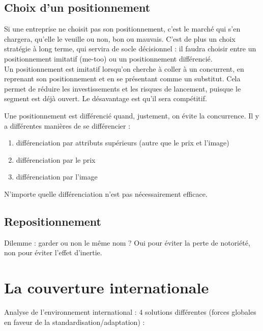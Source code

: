		
		\subsection{Choix d'un positionnement}
		
		Si une entreprise ne choisit pas son positionnement, c'est le marché qui s'en chargera, qu'elle le veuille ou non, bon ou mauvais. C'est de plus un choix stratégie à long terme, qui servira de socle décisionnel : il faudra choisir entre un positionnement imitatif (me-too) ou un positionnement différencié. \\
		
		Un positionnement est imitatif lorsqu'on cherche à coller à un concurrent, en reprenant son positionnement et en se présentant comme un substitut. Cela permet de réduire les investissements et les risques de lancement, puisque le segment est déjà ouvert. Le désavantage est qu'il sera compétitif.
		
		Une positionnement est différencié quand, justement, on évite la concurrence. Il y a différentes manières de se différencier :
		
		\begin{enumerate}
			\item différenciation par attributs supérieurs (autre que le prix et l'image)
			\item différenciation par le prix
			\item différenciation par l'image
		\end{enumerate}
		
		N'importe quelle différenciation n'est pas nécessairement efficace.
			
		
		\subsection{Repositionnement}
		
		Dilemme : garder ou non le même nom ? Oui pour éviter la perte de notoriété, non pour éviter l'effet d'inertie.
	
	
	\section{La couverture internationale}
		Analyse de l'environnement international : 4 solutions différentes (forces globales en faveur de la standardisation/adaptation) : 
		
		
